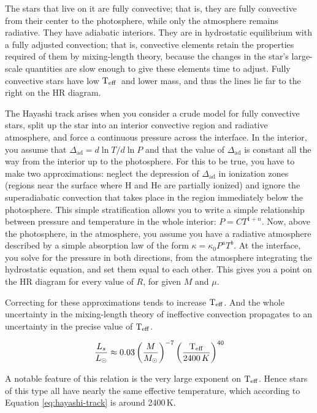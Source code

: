 \documentclass[12pt, letterpaper, preprint]{aastex}
\newcommand{\teff}{\mbox{$\rm T_{eff}$}}
\begin{document}
\begin{enumerate}
The stars that live on it are fully convective; that is, they are fully convective from their center to the photosphere, while only the atmosphere remains radiative. They have adiabatic interiors. They are in hydrostatic equilibrium with a fully adjusted convection; that is, convective elements retain the properties required of them by mixing-length theory, because the changes in the star's large-scale quantities are slow enough to give these elements time to adjust. Fully convective stars have low \teff\ and lower mass, and thus the lines lie far to the right on the HR diagram.

The Hayashi track arises when you consider a crude model for fully convective stars, split up the star into an interior convective region and radiative atmosphere, and force a continuous pressure across the interface. In the interior, you assume that $\Delta_\mathrm{ad} = d \ln T / d \ln P$ and that the value of $\Delta_\mathrm{ad}$ is constant all the way from the interior up to the photosphere. For this to be true, you have to make two approximations: neglect the depression of $\Delta_\mathrm{ad}$ in ionization zones (regions near the surface where H and He are partially ionized) and ignore the superadiabatic convection that takes place in the region immediately below the photosphere. This simple stratification allows you to write a simple relationship between pressure and temperature in the whole interior: $P = CT^{1+n}$. Now, above the photosphere, in the atmosphere, you assume you have a radiative atmosphere described by a simple absorption law of the form $\kappa = \kappa_0 P^a T^b$. At the interface, you solve for the pressure in both directions, from the atmosphere integrating the hydrostatic equation, and set them equal to each other. This gives you a point on the HR diagram for every value of $R$, for given $M$ and $\mu$.

Correcting for these approximations tends to increase \teff. And the whole uncertainty in the mixing-length theory of ineffective convection propagates to an uncertainty in the precise value of \teff. 
     
\begin{equation}
\frac{L_s}{L_\odot} \approx 0.03 \left( \frac{M}{M_\odot} \right)^{-7} \left( \frac{\teff}{2400\,K} \right)^{40} 
\label{eq:hayashi-track}
\end{equation}

A notable feature of this relation is the very large exponent on \teff. Hence stars of this type all have nearly the same effective temperature, which according to Equation \ref{eq:hayashi-track} is around 2400\,K. 


\end{enumerate}
\end{document}

